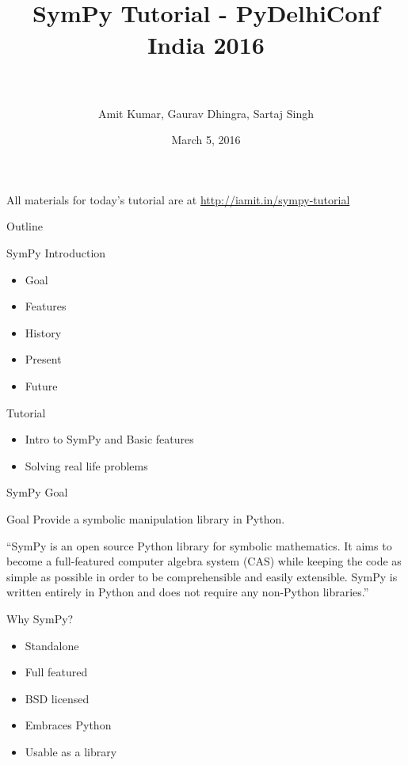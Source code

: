 \documentclass[xcolor=svgnames]{beamer}
\title[SymPy\hspace{4em}\insertframenumber/
  \inserttotalframenumber]{~\\ SymPy Tutorial - PyDelhiConf India 2016\\~}
\author[Amit Kumar, Gaurav Dhingra, Sartaj Singh]
  {Amit Kumar, Gaurav Dhingra, Sartaj Singh}
\institute{\pgfuseimage{mylogo}}
\date{March 5, 2016}
\begin{document}
  \begin{frame}
    \maketitle
  \begin{center}
  \normalsize All materials for today's tutorial are at \url{http://iamit.in/sympy-tutorial}
  \end{center}
  \end{frame}
  
  \begin{frame}{Outline}
    \begin{block}{SymPy Introduction}
      \begin{itemize}
      \item Goal
      \item Features
      \item History
      \item Present
      \item Future
      \end{itemize}
    \end{block}

    \begin{block}{Tutorial}
      \begin{itemize}
      \item Intro to SymPy and Basic features
      \item Solving real life problems
      \end{itemize}
    \end{block}
  \end{frame}

  \begin{frame}{SymPy Goal}
    \begin{block}{Goal}
      Provide a symbolic manipulation library in Python.
    \end{block}
    \begin{block}

      ``SymPy is an open source Python library for symbolic mathematics. It aims to
      become a full-featured computer algebra system (CAS) while keeping the code as
      simple as possible in order to be comprehensible and easily extensible. SymPy
      is written entirely in Python and does not require any non-Python libraries.''

    \end{block}
  \end{frame}

  \begin{frame}{Why SymPy?}
    \begin{block}{}
      \begin{itemize}
        \item Standalone
        \item Full featured
        \item BSD licensed
        \item Embraces Python
        \item Usable as a library
      \end{itemize}
    \end{block}
  \end{frame}
\end{document}
